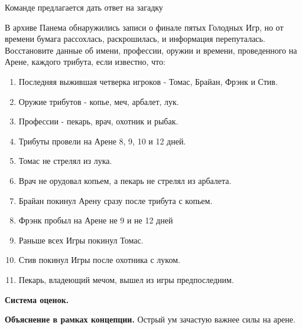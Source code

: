 
\par Команде предлагается дать ответ на загадку
\par В архиве Панема обнаружились записи о финале пятых Голодных Игр, но от времени бумага рассохлась, раскрошилась, и информация перепуталась. Восстановите данные об имени, профессии, оружии и времени, проведенного на Арене, каждого трибута, если известно, что:
\begin{enumerate}
\item Последняя выжившая четверка игроков - Томас, Брайан, Фрэнк и Стив.
\item Оружие трибутов - копье, меч, арбалет, лук.
\item Профессии - пекарь, врач, охотник и рыбак.
\item Трибуты провели на Арене 8, 9, 10 и 12 дней.
\item Томас не стрелял из лука.
\item Врач не орудовал копьем, а пекарь не стрелял из арбалета.
\item Брайан покинул Арену сразу после трибута с копьем.
\item Фрэнк пробыл на Арене не 9 и не 12 дней
\item Раньше всех Игры покинул Томас.
\item Стив покинул Игры после охотника с луком.
\item Пекарь, владеющий мечом, вышел из игры предпоследним.
\end{enumerate}

\par \textbf{Система оценок.}

\par \textbf{Объяснение в рамках концепции.} Острый ум зачастую важнее силы на арене.